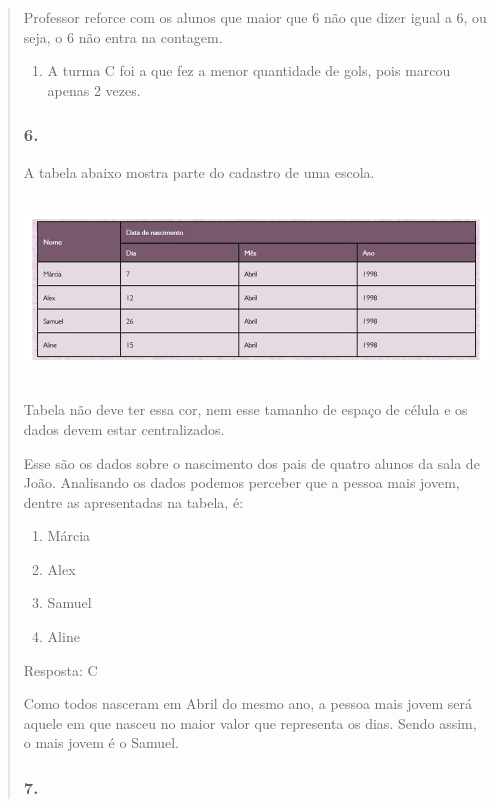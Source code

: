 \begin{enumerate}
\begin{escolha}
\begin{enumerate}
\begin{itemize}
\begin{itemize}
\begin{escolha}
\begin{quote}
\begin{escolha}
{Professor reforce com os alunos que maior que 6 não que dizer igual a 6,
ou seja, o 6 não entra na contagem.

\begin{enumerate}
\def\labelenumi{\alph{enumi})}
\item
  A turma C foi a que fez a menor quantidade de gols, pois marcou apenas
  2 vezes.
\end{enumerate}

\subsubsection{6.}\label{section-96}

A tabela abaixo mostra parte do cadastro de uma escola.

\includegraphics[width=5.90556in,height=1.93264in]{media/image98.png}

Tabela não deve ter essa cor, nem esse tamanho de espaço de célula e os
dados devem estar centralizados.

Esse são os dados sobre o nascimento dos pais de quatro alunos da sala
de João. Analisando os dados podemos perceber que a pessoa mais jovem,
dentre as apresentadas na tabela, é:

\begin{enumerate}
\def\labelenumi{\alph{enumi})}
\item
  Márcia
\item
  Alex
\item
  Samuel
\item
  Aline
\end{enumerate}

Resposta: C

Como todos nasceram em Abril do mesmo ano, a pessoa mais jovem será
aquele em que nasceu no maior valor que representa os dias. Sendo assim,
o mais jovem é o Samuel.

\subsubsection{7.}\label{section-97}

}
\end{escolha}
\end{quote}
\end{escolha}
\end{itemize}
\end{itemize}
\end{enumerate}
\end{escolha}
\end{enumerate}
